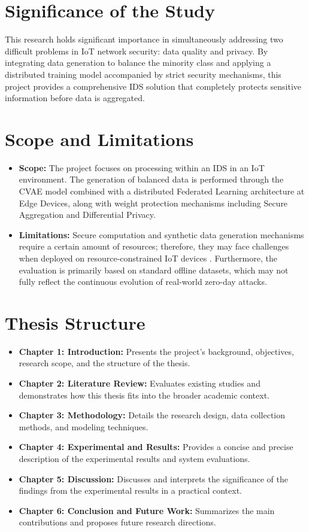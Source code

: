 \section{Significance of the Study}
This research holds significant importance in simultaneously addressing two difficult problems in IoT network security: data quality and privacy. By integrating data generation to balance the minority class and applying a distributed training model accompanied by strict security mechanisms, this project provides a comprehensive IDS solution that completely protects sensitive information before data is aggregated.

\section{Scope and Limitations}
\begin{itemize}
\item \textbf{Scope:} The project focuses on processing within an IDS in an IoT environment. The generation of balanced data is performed through the CVAE model combined with a distributed Federated Learning architecture at Edge Devices, along with weight protection mechanisms including Secure Aggregation and Differential Privacy.
\item \textbf{Limitations:} Secure computation and synthetic data generation mechanisms require a certain amount of resources; therefore, they may face challenges when deployed on resource-constrained IoT devices \cite{imteaj2022}. Furthermore, the evaluation is primarily based on standard offline datasets, which may not fully reflect the continuous evolution of real-world zero-day attacks.
\end{itemize}

\section{Thesis Structure}
\begin{itemize}
    \item \textbf{Chapter 1: Introduction:} Presents the project's background, objectives, research scope, and the structure of the thesis.
    \item \textbf{Chapter 2: Literature Review:} Evaluates existing studies and demonstrates how this thesis fits into the broader academic context.
    \item \textbf{Chapter 3: Methodology:} Details the research design, data collection methods, and modeling techniques.
    \item \textbf{Chapter 4: Experimental and Results:} Provides a concise and precise description of the experimental results and system evaluations.
    \item \textbf{Chapter 5: Discussion:} Discusses and interprets the significance of the findings from the experimental results in a practical context.
    \item \textbf{Chapter 6: Conclusion and Future Work:} Summarizes the main contributions and proposes future research directions.
\end{itemize}

